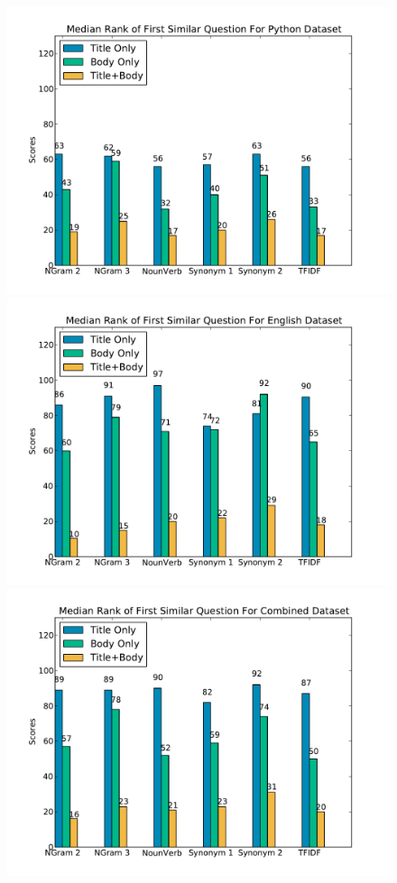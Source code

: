 \documentclass{acm_proc_article-sp}
\begin{document}
\begin{figure}[!htb]
\centering
{}
\includegraphics[width=1.1\linewidth]{images/Python_all-toprank-medians_plot.pdf}
\endminipage\hfill
{}
\includegraphics[width=1.1\linewidth]{images/English_all-toprank-medians_plot.pdf}
\endminipage\hfill
{}%
\includegraphics[width=1.1\linewidth]{images/Combined_all-toprank-medians_plot.pdf}


\end{figure}
\end{document}
